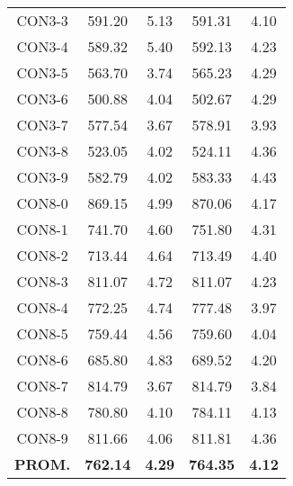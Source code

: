 \begin{minipage}[h]{0.45\linewidth}
\begin{table}[H]
\begin{tabular}{|c||c c c c|}
CON3-3 & 591.20 & 5.13 & 591.31 & 4.10\\
CON3-4 & 589.32 & 5.40 & 592.13 & 4.23\\
CON3-5 & 563.70 & 3.74 & 565.23 & 4.29\\
CON3-6 & 500.88 & 4.04 & 502.67 & 4.29\\
CON3-7 & 577.54 & 3.67 & 578.91 & 3.93\\
CON3-8 & 523.05 & 4.02 & 524.11 & 4.36\\
CON3-9 & 582.79 & 4.02 & 583.33 & 4.43\\
CON8-0 & 869.15 & 4.99 & 870.06 & 4.17\\
CON8-1 & 741.70 & 4.60 & 751.80 & 4.31\\
CON8-2 & 713.44 & 4.64 & 713.49 & 4.40\\
CON8-3 & 811.07 & 4.72 & 811.07 & 4.23\\
CON8-4 & 772.25 & 4.74 & 777.48 & 3.97\\
CON8-5 & 759.44 & 4.56 & 759.60 & 4.04\\
CON8-6 & 685.80 & 4.83 & 689.52 & 4.20\\
CON8-7 & 814.79 & 3.67 & 814.79 & 3.84\\
CON8-8 & 780.80 & 4.10 & 784.11 & 4.13\\
CON8-9 & 811.66 & 4.06 & 811.81 & 4.36\\\hline\hline\bf{PROM.} & 
 \bf{762.14} & \bf{4.29} & \bf{764.35} & \bf{4.12}\\[1ex]\hline
\end{tabular}
\label{apendice-table:finalD-IGA}
\end{table}
\end{minipage}
\hspace{0.5cm}
